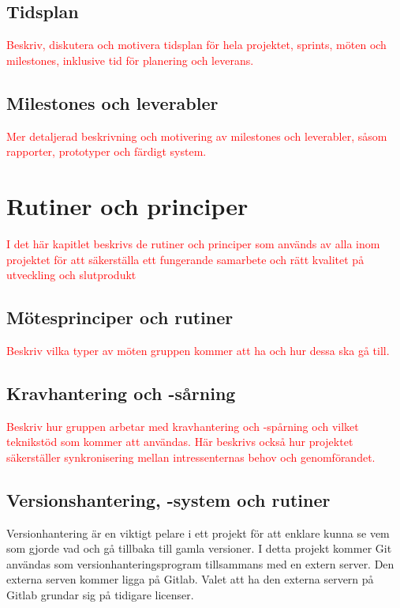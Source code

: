 \documentclass[a4paper,12pt,oneside,final]{extbook}
\begin{document}
\section{Tidsplan}

\textcolor{red}{Beskriv, diskutera och motivera tidsplan för hela projektet, sprints, möten och milestones, inklusive
tid för planering och leverans.}

\section{Milestones och leverabler}

\textcolor{red}{Mer detaljerad beskrivning och motivering av milestones och leverabler, såsom rapporter, prototyper
och färdigt system.
}


\chapter{Rutiner och principer}



\textcolor{red}{I det här kapitlet beskrivs de rutiner och principer som används av alla inom projektet för att säkerställa
ett fungerande samarbete och rätt kvalitet på utveckling och slutprodukt}
\section{Mötesprinciper och rutiner}

\textcolor{red}{Beskriv vilka typer av möten gruppen kommer att ha och hur dessa ska gå till.}


\section{Kravhantering och -sårning}

\textcolor{red}{Beskriv hur gruppen arbetar med kravhantering och -spårning och vilket teknikstöd som kommer att
användas.}
\textcolor{red}{Här beskrivs också hur projektet säkerställer synkronisering mellan intressenternas behov och genomförandet.}


\section{Versionshantering, -system och rutiner}
Versionhantering är en viktigt pelare i ett projekt för att enklare kunna se vem som gjorde vad och gå tillbaka till gamla versioner. I detta projekt kommer Git användas som versionhanteringsprogram tillsammans med en extern server. Den externa serven kommer ligga på Gitlab. Valet att ha den externa servern på Gitlab grundar sig på tidigare licenser.
\end{document}

